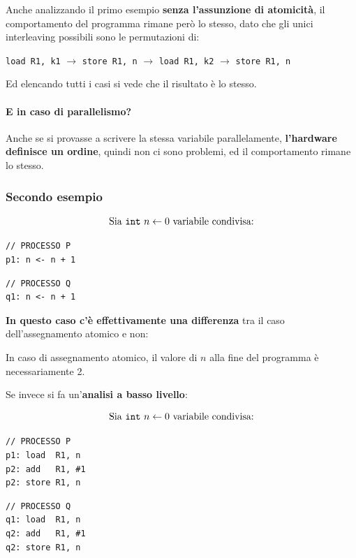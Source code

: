 \documentclass[a4paper,10pt]{article}
\begin{document}
 \newpage
Anche analizzando il primo esempio \textbf{senza l'assunzione di atomicità}, il comportamento del programma rimane però lo stesso, dato che gli unici interleaving possibili sono le permutazioni di:
\begin{center}
 
\texttt{load R1, k1} $\to$ \texttt{store R1, n} $\to$ \texttt{load R1, k2} $\to$ \texttt{store R1, n} 

\end{center}
Ed elencando tutti i casi si vede che il risultato è lo stesso.

\paragraph{E in caso di parallelismo?}

Anche se si provasse a scrivere la stessa variabile parallelamente, \textbf{l'hardware definisce un ordine}, quindi non ci sono problemi, ed il comportamento rimane lo stesso.
\subsubsection{Secondo esempio}

\[\text{Sia \texttt{int} }n \leftarrow 0 \text{ variabile condivisa:}\]
\begin{multicols}{2}
 \begin{lstlisting}
// PROCESSO P
p1: n <- n + 1\end{lstlisting}
\begin{lstlisting}
// PROCESSO Q
q1: n <- n + 1\end{lstlisting}

\end{multicols}

\textbf{In questo caso c'è effettivamente una differenza} tra il caso dell'assegnamento atomico e non:

In caso di assegnamento atomico, il valore di $n$ alla fine del programma è necessariamente 2.\medskip


Se invece si fa un'\textbf{analisi a basso livello}:

\[\text{Sia \texttt{int} }n \leftarrow 0 \text{ variabile condivisa:}\]
\begin{multicols}{2}
 \begin{lstlisting}
// PROCESSO P
p1: load  R1, n
p2: add   R1, #1
p2: store R1, n\end{lstlisting}
\begin{lstlisting}
// PROCESSO Q
q1: load  R1, n
q2: add   R1, #1
q2: store R1, n\end{lstlisting}
\end{multicols}
\end{document}

